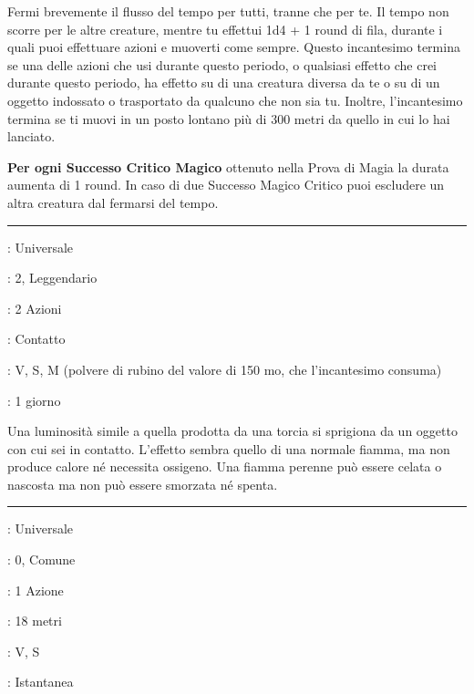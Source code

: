 \begin{multicols}{2}
Fermi brevemente il flusso del tempo per tutti, tranne che per te. Il tempo non scorre per le altre creature, mentre tu effettui 1d4 + 1 round di fila, durante i quali puoi effettuare azioni e muoverti come sempre. Questo incantesimo termina se una delle azioni che usi durante questo periodo, o qualsiasi effetto che crei durante questo periodo, ha effetto su di una creatura diversa da te o su di un oggetto indossato o trasportato da qualcuno che non sia tu. Inoltre, l'incantesimo termina se ti muovi in un posto lontano più di 300 metri da quello in cui lo hai lanciato.

\textbf{Per ogni Successo Critico Magico} ottenuto nella Prova di Magia la durata aumenta di 1 round. In caso di due Successo Magico Critico puoi escludere un altra creatura dal fermarsi del tempo.

\smallskip\noindent\rule{\linewidth}{2pt} \hypertarget{Fiamma Perenne}{}\medskip{}
\noindent
\begin{description}[noitemsep, topsep=0pt, parsep=0pt, partopsep=0pt, leftmargin=0cm, labelwidth=2.8cm]
	\item[\textbf{Lista di Magia}]: Universale
	\item[\textbf{Livello}]: 2, Leggendario
	\item[\textbf{T. di Lancio}]: 2 Azioni
	\item[\textbf{Gittata}]: Contatto
	\item[\textbf{Componenti}]: V, S, M (polvere di rubino del valore di 150 mo, che l'incantesimo consuma)
	\item[\textbf{Durata}]: 1 giorno
\end{description}

Una luminosità simile a quella prodotta da una torcia si sprigiona da un oggetto con cui sei in contatto. L'effetto sembra quello di una normale fiamma, ma non produce calore né necessita ossigeno. Una fiamma perenne può essere celata o nascosta ma non può essere smorzata né spenta.

\smallskip\noindent\rule{\linewidth}{2pt} \hypertarget{Fiamma Sacra}{}\medskip{}
\noindent
\begin{description}[noitemsep, topsep=0pt, parsep=0pt, partopsep=0pt, leftmargin=0cm, labelwidth=2.8cm]
	\item[\textbf{Lista di Magia}]: Universale
	\item[\textbf{Livello}]: 0, Comune
	\item[\textbf{T. di Lancio}]: 1 Azione
	\item[\textbf{Gittata}]: 18 metri
	\item[\textbf{Componenti}]: V, S
	\item[\textbf{Durata}]: Istantanea
\end{description}


\end{multicols}
